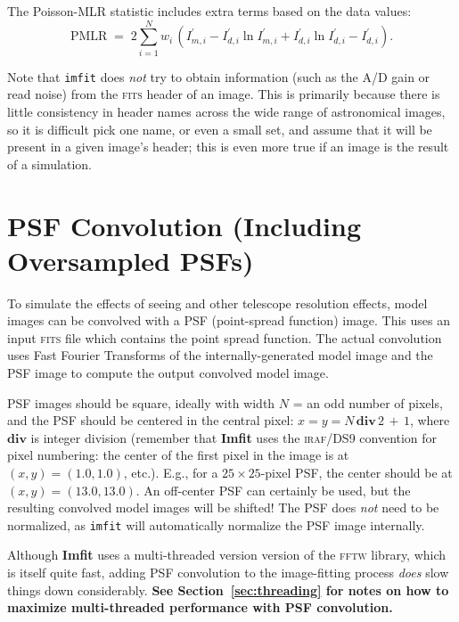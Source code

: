 \documentclass[10pt,a4paper,article]{memoir}
\newcommand{\imfit}{\textbf{Imfit}}
\newcommand{\imfitprog}{\texttt{imfit}}
\newcommand{\pmlr}{PMLR}
\begin{document}
The Poisson-MLR statistic includes extra terms based on the data values:
\begin{equation}
\mathrm{\pmlr} \; = \;  2 \sum_{i = 1}^{N} w_{i} \, 
\left( I^{\prime}_{m, i} - I^{\prime}_{d, i} \ln I^{\prime}_{m, i} + I^{\prime}_{d, i} \ln I^{\prime}_{d, i} - I^{\prime}_{d, i} \right).
\end{equation}

\medskip

Note that \imfitprog{} does \textit{not} try to obtain information (such as
the A/D gain or read noise) from the \textsc{fits} header of an image. This is primarily
because there is little consistency in header names across the wide range of
astronomical images, so it is difficult pick one name, or even a small set, and
assume that it will be present in a given image's header; this is even more
true if an image is the result of a simulation.




\section{PSF Convolution (Including Oversampled PSFs)}

To simulate the effects of seeing and other telescope resolution effects, model
images can be convolved with a PSF (point-spread function) image. This uses an
input \textsc{fits} file which contains the point spread function. The actual convolution
uses Fast Fourier Transforms of the internally-generated model image and the PSF
image to compute the output convolved model image.

PSF images should be square, ideally with width $N$ = an odd number of
pixels, and the PSF should be centered in the central pixel: $x = y = N \,
\mathbf{div} \, 2 \, + \, 1$, where $\mathbf{div}$ is integer division (remember
that \imfit{} uses the \textsc{iraf}/DS9 convention for pixel numbering: the center
of the first pixel in the image is at $(x,y) = (1.0,1.0)$, etc.).
E.g., for a $25 \times 25$-pixel PSF, the center should be at $(x,y) =
(13.0,13.0)$. An off-center PSF can certainly be used, but the resulting
convolved model images will be shifted! The PSF does \textit{not} need
to be normalized, as \imfitprog{} will automatically normalize the PSF
image internally.

Although \imfit{} uses a multi-threaded version version of the
\textsc{fftw} library, which is itself quite fast, adding PSF
convolution to the image-fitting process \textit{does} slow things down
considerably. \textbf{See Section~\ref{sec:threading} for notes on how to maximize
multi-threaded performance with PSF convolution.}
\end{document}
